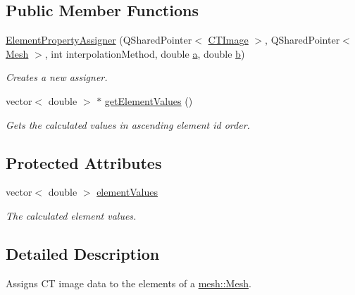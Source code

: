 \subsection*{Public Member Functions}
\begin{DoxyCompactItemize}
\item 
\hyperlink{classassignment_1_1_element_property_assigner_a6c7993d7aad6990a1aea6f28731d708c}{ElementPropertyAssigner} (QSharedPointer$<$ \hyperlink{classctimage_1_1_c_t_image}{CTImage} $>$, QSharedPointer$<$ \hyperlink{classmesh_1_1_mesh}{Mesh} $>$, int interpolationMethod, double \hyperlink{classassignment_1_1_node_property_assigner_a7bac7369b89b3351b2ff889114daaf6a}{a}, double \hyperlink{classassignment_1_1_node_property_assigner_a8d2dcf867efc99c60f076cc5d1d55114}{b})
\begin{DoxyCompactList}\small\item\em Creates a new assigner. \item\end{DoxyCompactList}\item 
vector$<$ double $>$ $\ast$ \hyperlink{classassignment_1_1_element_property_assigner_a3e555b9c99bef921efd6c91ae5ee4c32}{getElementValues} ()
\begin{DoxyCompactList}\small\item\em Gets the calculated values in ascending element id order. \item\end{DoxyCompactList}\end{DoxyCompactItemize}
\subsection*{Protected Attributes}
\begin{DoxyCompactItemize}
\item 
\hypertarget{classassignment_1_1_element_property_assigner_aabce575fea3bca22d13c31b2e7220860}{
vector$<$ double $>$ \hyperlink{classassignment_1_1_element_property_assigner_aabce575fea3bca22d13c31b2e7220860}{elementValues}}
\label{classassignment_1_1_element_property_assigner_aabce575fea3bca22d13c31b2e7220860}

\begin{DoxyCompactList}\small\item\em The calculated element values. \item\end{DoxyCompactList}\end{DoxyCompactItemize}


\subsection{Detailed Description}
Assigns CT image data to the elements of a \hyperlink{classmesh_1_1_mesh}{mesh::Mesh}. 

